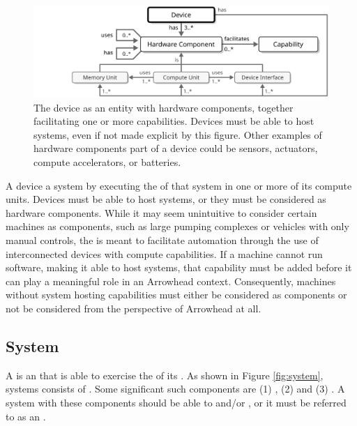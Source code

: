 \vfill

\begin{figure}[ht!]
  \centering
  \includegraphics[scale=0.9]{figures/device}
  \caption{
    The device as an entity with hardware components, together facilitating one or more capabilities.
    Devices must be able to host systems, even if not made explicit by this figure.
    Other examples of hardware components part of a device could be sensors, actuators, compute accelerators, or batteries.
  }
  \label{fig:device}
\end{figure}

A device  a system by executing the  of that system in one or more of its compute units.
Devices must be able to host systems, or they must be considered as hardware components.
While it may seem unintuitive to consider certain machines as components, such as large pumping complexes or vehicles with only manual controls, the  is meant to facilitate automation through the use of interconnected devices with compute capabilities.
If a machine cannot run software, making it able to host systems, that capability must be added before it can play a meaningful role in an Arrowhead context.
Consequently, machines without system hosting capabilities must either be considered as components or not be considered from the perspective of Arrowhead at all.

\subsection{System}
\label{sec:concepts:system}

A  is an   that is able to exercise the  of its  .
As shown in Figure \ref{fig:system}, systems consists of .
Some significant such components are (1) , (2)  and (3) .
A system with these components should be able to  and/or  , or it must be referred to as an .


